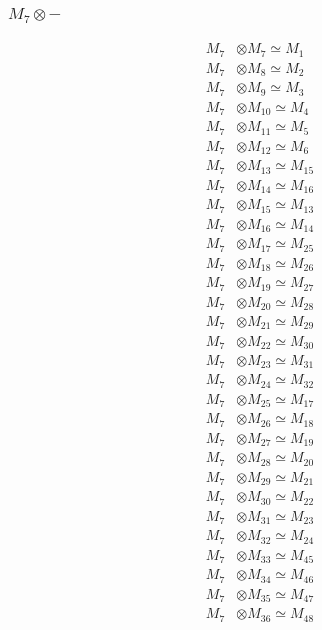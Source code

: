 \subsubsection{$ M_{7}\otimes -$}
\begin{align*}
M_{7} &\otimes M_{7} \simeq M_{1} \\
M_{7} &\otimes M_{8} \simeq M_{2} \\
M_{7} &\otimes M_{9} \simeq M_{3} \\
M_{7} &\otimes M_{10} \simeq M_{4} \\
M_{7} &\otimes M_{11} \simeq M_{5} \\
M_{7} &\otimes M_{12} \simeq M_{6} \\
M_{7} &\otimes M_{13} \simeq M_{15} \\
M_{7} &\otimes M_{14} \simeq M_{16} \\
M_{7} &\otimes M_{15} \simeq M_{13} \\
M_{7} &\otimes M_{16} \simeq M_{14} \\
M_{7} &\otimes M_{17} \simeq M_{25} \\
M_{7} &\otimes M_{18} \simeq M_{26} \\
M_{7} &\otimes M_{19} \simeq M_{27} \\
M_{7} &\otimes M_{20} \simeq M_{28} \\
M_{7} &\otimes M_{21} \simeq M_{29} \\
M_{7} &\otimes M_{22} \simeq M_{30} \\
M_{7} &\otimes M_{23} \simeq M_{31} \\
M_{7} &\otimes M_{24} \simeq M_{32} \\
M_{7} &\otimes M_{25} \simeq M_{17} \\
M_{7} &\otimes M_{26} \simeq M_{18} \\
M_{7} &\otimes M_{27} \simeq M_{19} \\
M_{7} &\otimes M_{28} \simeq M_{20} \\
M_{7} &\otimes M_{29} \simeq M_{21} \\
M_{7} &\otimes M_{30} \simeq M_{22} \\
M_{7} &\otimes M_{31} \simeq M_{23} \\
M_{7} &\otimes M_{32} \simeq M_{24} \\
M_{7} &\otimes M_{33} \simeq M_{45} \\
M_{7} &\otimes M_{34} \simeq M_{46} \\
M_{7} &\otimes M_{35} \simeq M_{47} \\
M_{7} &\otimes M_{36} \simeq M_{48} \\

\end{align*}
